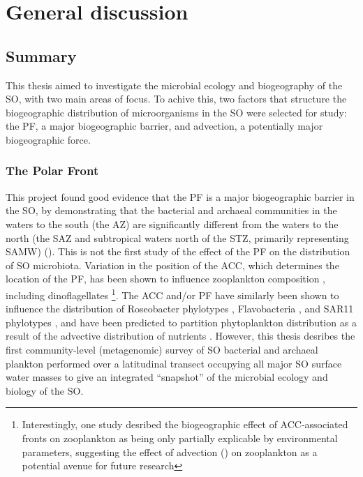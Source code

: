 \chapter{General discussion}
\label{ch:generaldiscussion}

\section{Summary}

This thesis aimed to investigate the microbial ecology and biogeography of the \ac{SO}, with two main areas of focus.
To achive this, two factors that structure the biogeographic distribution of microorganisms in the \ac{SO} were selected for study: the \ac{PF}, a major biogeographic barrier, and advection, a potentially major biogeographic force.

\subsection{The Polar Front}

This project found good evidence that the \ac{PF} is a major biogeographic barrier in the \ac{SO}, by demonstrating that the bacterial and archaeal communities in the waters to the south (the \ac{AZ}) are significantly different from the waters to the north (the \ac{SAZ} and subtropical waters north of the \ac{STZ}, primarily representing \ac{SAMW}) ().
This is not the first study of the effect of the \ac{PF} on the distribution of \ac{SO} microbiota.
Variation in the position of the \ac{ACC}, which determines the location of the \ac{PF}, has been shown to influence zooplankton composition \citep[e.g.][]{Chiba:2001un,Hunt:2001vp}, including dinoflagellates \cite{Esper:2002ui}\footnote{Interestingly, one study desribed the biogeographic effect of \ac{ACC}-associated fronts on zooplankton as being only partially explicable by environmental parameters, suggesting the effect of advection () on zooplankton as a potential avenue for future research}.
The \ac{ACC} and/or \ac{PF} have similarly been shown to influence the distribution of Roseobacter phylotypes \cite{Selje:2004ka,Giebel:2009hr}, Flavobacteria \cite{Abell:2005ji}, and SAR11 phylotypes \cite{Giebel:2009hr}, and have been predicted to partition phytoplankton distribution as a result of the advective distribution of nutrients \cite{Weber:2010fi}.
However, this thesis desribes the first community-level (metagenomic) survey of \ac{SO} bacterial and archaeal plankton performed over a latitudinal transect occupying all major \ac{SO} surface water masses to give an integrated ``snapshot'' of the microbial ecology and biology of the \ac{SO}.

